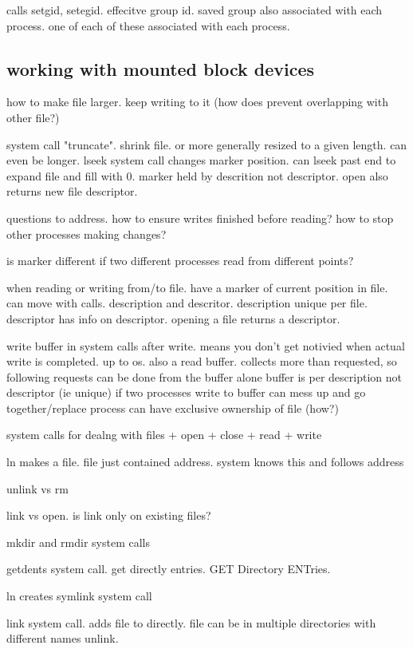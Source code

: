 calls setgid, setegid. effecitve group id. saved group also associated with each process. one of each of these associated with each process.

\subsection{working with mounted block devices}

how to make file larger. keep writing to it (how does prevent overlapping with other file?)

system call "truncate". shrink file. or more generally resized to a given length. can even be longer.
lseek system call changes marker position. can lseek past end to expand file and fill with 0.
marker held by descrition not descriptor.
open also returns new file descriptor.

questions to address. how to ensure writes finished before reading? how to stop other processes making changes?

is marker different if two different processes read from different points?

when reading or writing from/to file. have a marker of current position in file. can move with calls. description and descritor. description unique per file. descriptor has info on descriptor.
opening a file returns a descriptor.

write buffer in system calls after write. means you don't get notivied when actual write is completed. up to os.
also a read buffer. collects more than requested, so following requests can be done from the buffer alone
buffer is per description not descriptor (ie unique)
if two processes write to buffer can mess up and go together/replace
process can have exclusive ownership of file (how?)

system calls for dealng with files
+ open
+ close
+ read
+ write

ln makes a file. file just contained address. system knows this and follows address

unlink vs rm

link vs open. is link only on existing files?

mkdir and rmdir system calls

getdents system call. get directly entries. GET Directory ENTries.

ln creates symlink system call

link system call. adds file to directly. file can be in multiple directories with different names
unlink.

